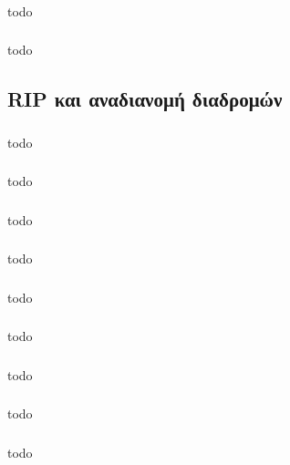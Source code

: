 \documentclass[a4paper, 12pt]{article}
\begin{document}
		\subsubsection{}
			todo

		\subsubsection{}
			todo

	\subsection{RIP και αναδιανομή διαδρομών}

		\subsubsection{}
			todo

		\subsubsection{}
			todo

		\subsubsection{}
			todo

		\subsubsection{}
			todo

		\subsubsection{}
			todo

		\subsubsection{}
			todo

		\subsubsection{}
			todo

		\subsubsection{}
			todo

		\subsubsection{}
			todo
\end{document}
